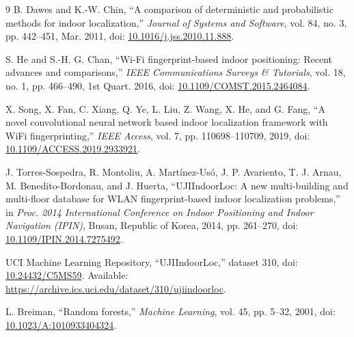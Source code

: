 \documentclass[conference]{IEEEtran}
\begin{document}
\small
\begin{thebibliography}{9}
B. Dawes and K.-W. Chin, ``A comparison of deterministic and probabilistic methods for indoor localization,'' \emph{Journal of Systems and Software}, vol. 84, no. 3, pp. 442--451, Mar. 2011, doi: \href{https://doi.org/10.1016/j.jss.2010.11.888}{10.1016/j.jss.2010.11.888}.

S. He and S.-H. G. Chan, ``Wi-Fi fingerprint-based indoor positioning: Recent advances and comparisons,'' \emph{IEEE Communications Surveys \& Tutorials}, vol. 18, no. 1, pp. 466--490, 1st Quart. 2016, doi: \href{https://doi.org/10.1109/COMST.2015.2464084}{10.1109/COMST.2015.2464084}.

X. Song, X. Fan, C. Xiang, Q. Ye, L. Liu, Z. Wang, X. He, and G. Fang, ``A novel convolutional neural network based indoor localization framework with WiFi fingerprinting,'' \emph{IEEE Access}, vol. 7, pp. 110698--110709, 2019, doi: \href{https://doi.org/10.1109/ACCESS.2019.2933921}{10.1109/ACCESS.2019.2933921}.

J. Torres-Sospedra, R. Montoliu, A. Mart\'{i}nez-Us\'{o}, J. P. Avariento, T. J. Arnau, M. Benedito-Bordonau, and J. Huerta,
``UJIIndoorLoc: A new multi-building and multi-floor database for WLAN fingerprint-based indoor localization problems,''
in \emph{Proc. 2014 International Conference on Indoor Positioning and Indoor Navigation (IPIN)}, Busan, Republic of Korea, 2014, pp. 261--270, doi: \href{https://doi.org/10.1109/IPIN.2014.7275492}{10.1109/IPIN.2014.7275492}.

UCI Machine Learning Repository, ``UJIIndoorLoc,'' dataset 310, doi: \href{https://doi.org/10.24432/C5MS59}{10.24432/C5MS59}. Available: \url{https://archive.ics.uci.edu/dataset/310/ujiindoorloc}.

L. Breiman, ``Random forests,'' \emph{Machine Learning}, vol. 45, pp. 5--32, 2001, doi: \href{https://doi.org/10.1023/A:1010933404324}{10.1023/A:1010933404324}.
\end{thebibliography}
\end{document}
